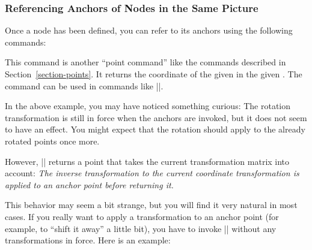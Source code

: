 \subsubsection{Referencing Anchors of Nodes in the Same Picture}

Once a node has been defined, you can refer to its anchors using the
following commands:

\begin{command}{\pgfpointanchor{}}
  This command is another ``point command'' like the commands
  described in Section~\ref{section-points}. It returns the coordinate
  of the given  in the given . The command can
  be used in commands like |\pgfpathmoveto|.

\begin{codeexample}[]
\begin{pgfpicture}

\end{pgfpicture}
\end{codeexample}

  In the above example, you may have noticed something curious: The
  rotation transformation is still in force when the anchors are
  invoked, but it does not seem to have an effect. You might expect
  that the rotation should apply to the already rotated points once
  more.

  However, |\pgfpointanchor| returns a point that takes the current
  transformation matrix into account: \emph{The inverse transformation
    to the current coordinate transformation is applied to an anchor
    point before returning it.}

  This behavior may seem a bit strange, but you will find it very
  natural in most cases. If you really want to apply a transformation
  to an anchor point (for example, to ``shift it away'' a little bit),
  you have to invoke |\pgfpointanchor| without any transformations in
  force. Here is an example:

\makeatletter
\begin{codeexample}[]
\begin{pgfpicture}


\end{pgfpicture}
\end{codeexample}
\end{command}
